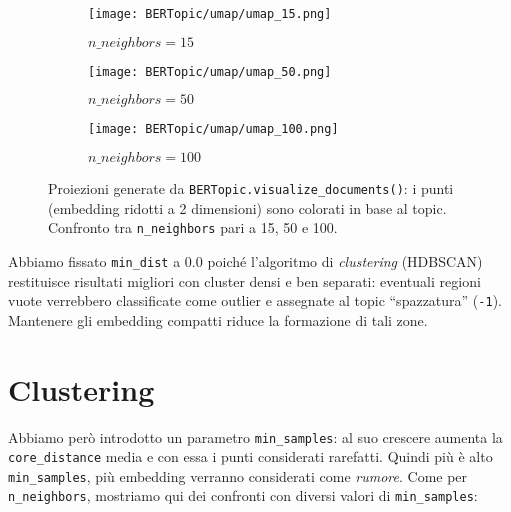 \begin{figure}[H]
\centering
\begin{subfigure}{0.32\textwidth}
    \centering
    \texttt{[image: BERTopic/umap/umap\_15.png]}
    \caption{$n\_neighbors = 15$}
\end{subfigure}\hfill
\begin{subfigure}{0.32\textwidth}
    \centering
    \texttt{[image: BERTopic/umap/umap\_50.png]}
    \caption{$n\_neighbors = 50$}
\end{subfigure}\hfill
\begin{subfigure}{0.32\textwidth}
    \centering
    \texttt{[image: BERTopic/umap/umap\_100.png]}
    \caption{$n\_neighbors = 100$}
\end{subfigure}
\caption{Proiezioni generate da \texttt{BERTopic.\allowbreak visualize\_documents()}: i punti (embedding ridotti a 2 dimensioni) sono colorati in base al topic. Confronto tra \texttt{n\_neighbors} pari a 15, 50 e 100.}
\label{fig:umap-neighbors-comparison}
\end{figure}

\noindent Abbiamo fissato \texttt{min\_dist} a $0.0$ poiché l'algoritmo di \emph{clustering} (HDBSCAN) restituisce risultati migliori con cluster densi e ben separati: eventuali regioni vuote verrebbero classificate come outlier e assegnate al topic ``spazzatura'' (\texttt{-1}). Mantenere gli embedding compatti riduce la formazione di tali zone.

\section{Clustering}
Abbiamo però introdotto un parametro \texttt{min\_samples}: al suo crescere aumenta la \texttt{core\_distance} media e con essa i punti considerati rarefatti.
Quindi più è alto \texttt{min\_samples}, più embedding verranno considerati come \textit{rumore}.
Come per \texttt{n\_neighbors}, mostriamo qui dei confronti con diversi valori di \texttt{min\_samples}:

